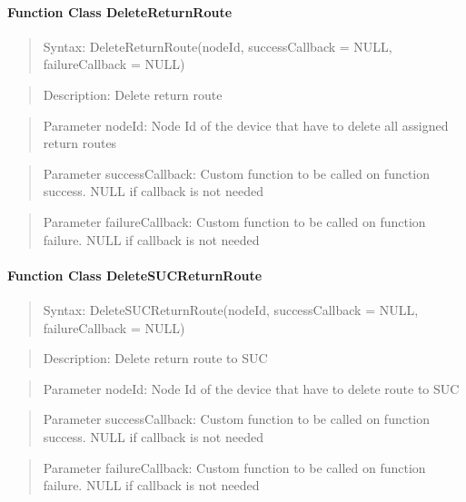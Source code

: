 \paragraph{Function Class DeleteReturnRoute}
\begin{quote}Syntax: DeleteReturnRoute(nodeId, successCallback = NULL, failureCallback = NULL)\end{quote}
\begin{quote}Description: Delete return route\end{quote}
\begin{quote}Parameter nodeId: Node Id of the device that have to delete all assigned return routes\end{quote}
\begin{quote}Parameter successCallback: Custom function to be called on function success. NULL if callback is not needed\end{quote}
\begin{quote}Parameter failureCallback: Custom function to be called on function failure. NULL if callback is not needed\end{quote}


\paragraph{Function Class DeleteSUCReturnRoute}
\begin{quote}Syntax: DeleteSUCReturnRoute(nodeId, successCallback = NULL, failureCallback = NULL)\end{quote}
\begin{quote}Description: Delete return route to SUC\end{quote}
\begin{quote}Parameter nodeId: Node Id of the device that have to delete route to SUC\end{quote}
\begin{quote}Parameter successCallback: Custom function to be called on function success. NULL if callback is not needed\end{quote}
\begin{quote}Parameter failureCallback: Custom function to be called on function failure. NULL if callback is not needed\end{quote}


